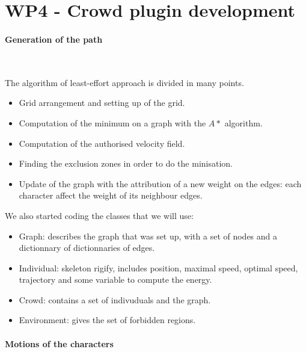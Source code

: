 \section{WP4 - Crowd plugin development}

\paragraph{Generation of the path}~

\noindent The algorithm of least-effort approach is divided in many points.
\begin{itemize}
  \item Grid arrangement and setting up of the grid.
  \item Computation of the minimum on a graph with the $A*$ algorithm.
  \item Computation of the authorised velocity field.
  \item Finding the exclusion zones in order to do the minisation.
  \item Update of the graph with the attribution of a new weight on the edges: each character affect the weight of its neighbour edges.
\end{itemize}

\noindent We also started coding the classes that we will use:
\begin{itemize}
  \item Graph: describes the graph that was set up, with a set of nodes and a dictionnary of dictionnaries of edges.
  \item Individual: skeleton rigify, includes position, maximal speed, optimal speed, trajectory and some variable to compute the energy.
  \item Crowd: contains a set of indivuduals and the graph.
  \item Environment: gives the set of forbidden regions.
\end{itemize}

\paragraph{Motions of the characters}~
